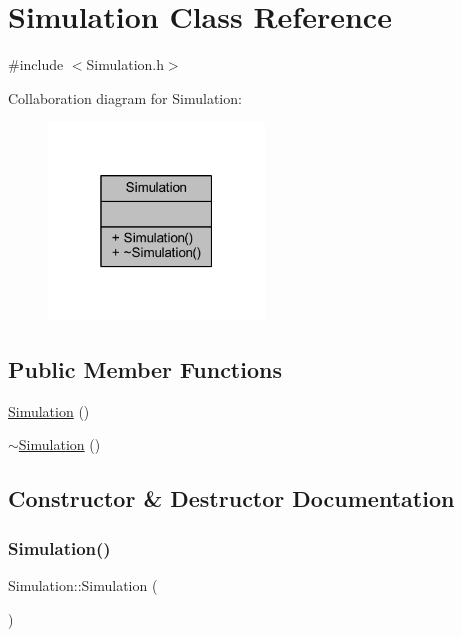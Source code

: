 \hypertarget{class_simulation}{}\section{Simulation Class Reference}
\label{class_simulation}


{\ttfamily \#include $<$Simulation.\+h$>$}



Collaboration diagram for Simulation\+:\nopagebreak
\begin{figure}[H]
\begin{center}
\leavevmode
\includegraphics[width=163pt]{class_simulation__coll__graph}
\end{center}
\end{figure}
\subsection*{Public Member Functions}
\begin{DoxyCompactItemize}
\item 
\mbox{\hyperlink{class_simulation_a5b224cc5b36bcc8eb29689aff223de41}{Simulation}} ()
\item 
\mbox{\hyperlink{class_simulation_a80fad3f57dfaf195a36f7bc49bc88279}{$\sim$\+Simulation}} ()
\end{DoxyCompactItemize}


\subsection{Constructor \& Destructor Documentation}
\mbox{\label{class_simulation_a5b224cc5b36bcc8eb29689aff223de41}} 
\subsubsection{\texorpdfstring{Simulation()}{Simulation()}}
{\footnotesize\ttfamily Simulation\+::\+Simulation (\begin{DoxyParamCaption}{ }\end{DoxyParamCaption})\hspace{0.3cm}{\ttfamily [explicit]}}

